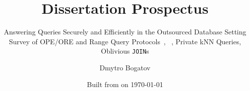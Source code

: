 \title{Dissertation Prospectus}

\subtitle{
	Answering Queries Securely and Efficiently in the Outsourced Database Setting \\
	{\small Survey of OPE/ORE and Range Query Protocols~\cite{ore-benchmark-17}, \epsolute{}~\cite{epsolute}, Private kNN Queries, Oblivious \texttt{JOIN}s}
}

\date{Built from \href{https://git.dbogatov.org/bu/proposal/presentation/commit/\version}{\emph{\version}} on \today}

\author{Dmytro Bogatov \\ }


\def\wm{\begin{tabular}{c} Dmytro Bogatov \\ Boston University \end{tabular}}
